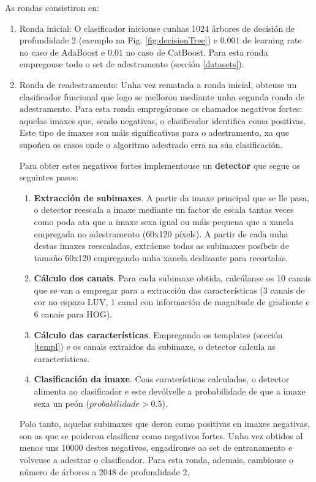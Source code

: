 \documentclass[galician]{./head/uvigo-tfg}
\begin{document}
        \par As rondas consistiron en:
        \begin{enumerate}
            \item Ronda inicial: O clasificador iniciouse cunhas 1024 árbores de decisión de profundidade 2 (exemplo na Fig. \ref{fig:decisionTree}) e $0.001$ de learning rate no caso de AdaBoost e $0.01$ no caso de CatBoost. Para esta ronda empregouse todo o set de adestramento (sección \ref{datasets}).
            \item Ronda de readestramento: Unha vez rematada a ronda inicial, obteuse un clasificador funcional que logo se mellorou mediante unha segunda ronda de adestramento. Para esta ronda empregáronse os chamados negativos fortes: aquelas imaxes que, sendo negativas, o clasificador identifica coma positivas. Este tipo de imaxes son máis significativas para o adestramento, xa que supoñen os casos onde o algoritmo adestrado erra na súa clasificación.
            \par Para obter estes negativos fortes implementouse un \textbf{detector} que segue os seguintes pasos:
            \begin{enumerate}
                \item \textbf{Extracción de subimaxes}. A partir da imaxe principal que se lle pasa, o detector reescala a imaxe mediante un factor de escala tantas veces como poda ata que a imaxe sexa igual ou máis pequena que a xanela empregada no adestramento (60x120 píxels). A partir de cada unha destas imaxes reescaladas, extráense todas as subimaxes posíbeis de tamaño 60x120 empregando unha xanela deslizante para recortalas.
                \item \textbf{Cálculo dos canais}. Para cada subimaxe obtida, calcúlanse os 10 canais que se van a empregar para a extracción das características (3 canais de cor no espazo LUV, 1 canal con información de magnitude de gradiente e 6 canais para HOG).
                \item \textbf{Cálculo das características}. Empregando os templates (sección \ref{templ}) e os canais extraidos da subimaxe, o detector calcula as características.
                \item \textbf{Clasificación da imaxe}. Coas caraterísticas calculadas, o detector alimenta ao clasificador e este devólvelle a probabilidade de que a imaxe sexa un peón ($probabilidade>0.5$).
            \end{enumerate}
            
            \par Polo tanto, aquelas subimaxes que deron como positivas en imaxes negativas, son as que se poideron clasificar como negativos fortes. Unha vez obtidos al menos uns 10000 destes negativos, engadíronse ao set de entranamento e volveuse a adestrar o clasificador. Para esta ronda, ademais, cambiouse o número de árbores a 2048 de profundidade 2\cite{filtered}.
        \end{enumerate}
\end{document}
